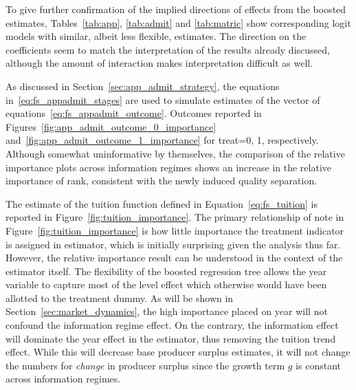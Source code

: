 \documentclass[12pt]{article}
\theoremstyle{definition}
\begin{document}
To give further confirmation of the implied directions of effects from the boosted estimates, Tables~\ref{tab:app}, \ref{tab:admit} and \ref{tab:matric} show corresponding logit models with similar, albeit less flexible, estimates. The direction on the coefficients seem to match the interpretation of the results already discussed, although the amount of interaction makes interpretation difficult as well.

As discussed in Section~\ref{sec:app_admit_strategy}, the equations in~\eqref{eq:fs_appadmit_stages} are used to simulate estimates of the vector of equations~\eqref{eq:fs_appadmit_outcome}. Outcomes reported in Figures~\ref{fig:app_admit_outcome_0_importance} and~\ref{fig:app_admit_outcome_1_importance} for treat=0, 1, respectively. Although somewhat uninformative by themselves, the comparison of the relative importance plots across information regimes shows an increase in the relative importance of rank, consistent with the newly induced quality separation.

The estimate of the tuition function defined in Equation~\eqref{eq:fs_tuition} is reported in Figure~\ref{fig:tuition_importance}. The primary relationship of note in Figure~\ref{fig:tuition_importance} is how little importance the treatment indicator is assigned in estimator, which is initially surprising given the analysis thus far. However, the relative importance result can be understood in the context of the estimator itself. The flexibility of the boosted regression tree allows the year variable to capture most of the level effect which otherwise would have been allotted to the treatment dummy. As will be shown in Section~\ref{sec:market_dynamics}, the high importance placed on year will not confound the information regime effect. On the contrary, the information effect will dominate the year effect in the estimator, thus removing the tuition trend effect. While this will decrease base producer surplus estimates, it will not change the numbers for \emph{change} in producer surplus since the growth term $g$ is constant across information regimes.



%
%
%
%
%
%






\end{document}
